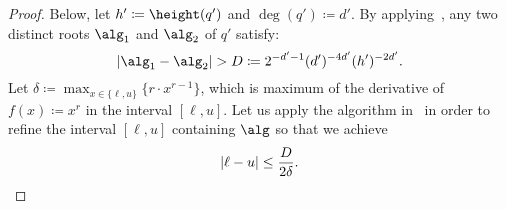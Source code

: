 \begin{proof}

  Below, let $h' \coloneqq \height(q')$ and $\deg(q') \coloneqq d'$.
  By applying~\cite[Theorem~A.2]{Bugeaud04}, any two distinct roots $\alg_1$ and
  $\alg_2$ of $q'$ satisfy:
  \begin{equation}
    \label{eq:close-roots}
    \abs{\alg_1 - \alg_2} > D \coloneqq 2^{-d'-1} (d')^{-4d'} (h')^{-2d'}.
  \end{equation}
  Let $\delta \coloneqq \max_{x\in\{\ell,u\}}\{r\cdot x^{r-1}\}$,
  which is maximum of the derivative of $f(x) \coloneqq x^r$ in the interval $[\ell,u]$.
  Let us apply the algorithm in~ 
  in order to refine the interval $[\ell,u]$ containing $\alg$ 
  so that we achieve 
  \begin{equation*}
    \left|\ell-u\right|\leq \frac{D}{2\delta}.
  \end{equation*}


\end{proof}
